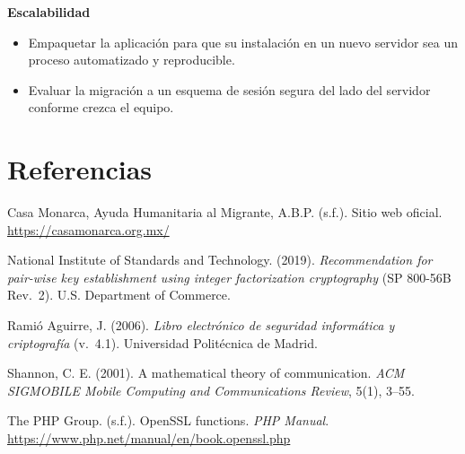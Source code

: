 \documentclass[10pt,letterpaper]{report}
\begin{document}
\textbf{Escalabilidad}
\begin{itemize}[noitemsep]
  \item Empaquetar la aplicación para que su instalación en un nuevo servidor sea un proceso automatizado y reproducible.
  \item Evaluar la migración a un esquema de sesión segura del lado del servidor conforme crezca el equipo.
\end{itemize}

\clearpage
\chapter*{Referencias}

\begin{enumerate}[label={[\arabic*]}]
  \item Casa Monarca, Ayuda Humanitaria al Migrante, A.B.P. (s.f.). Sitio web oficial. \url{https://casamonarca.org.mx/}

  \item National Institute of Standards and Technology. (2019). \textit{Recommendation for pair-wise key establishment using integer factorization cryptography} (SP 800-56B Rev.\ 2). U.S. Department of Commerce.

  \item Ramió Aguirre, J. (2006). \textit{Libro electrónico de seguridad informática y criptografía} (v.\ 4.1). Universidad Politécnica de Madrid.

  \item Shannon, C. E. (2001). A mathematical theory of communication. \textit{ACM SIGMOBILE Mobile Computing and Communications Review}, 5(1), 3--55.

  \item The PHP Group. (s.f.). OpenSSL functions. \textit{PHP Manual}. \url{https://www.php.net/manual/en/book.openssl.php}
\end{enumerate}
\end{document}
